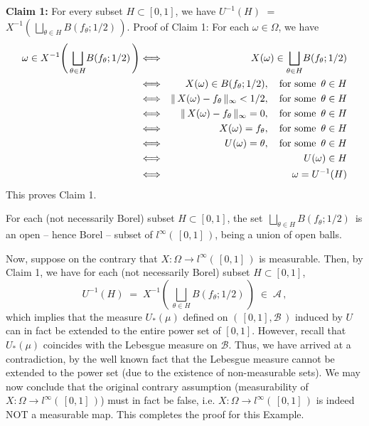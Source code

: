 \vskip 0.5cm
\noindent
\textbf{Claim 1:}\;\;
For every subset $H \subset [0,1]$, we have
$U^{-1}(H)$ $=$ $X^{-1}\!\left(\,\underset{\theta\in H}{\bigsqcup}B(f_{\theta};1/2)\,\right)$.
\vskip 0.3cm
\noindent
Proof of Claim 1:\quad
For each $\omega \in \Omega$, we have
\begin{eqnarray*}
\omega \in X^{-1}\!\left(\,\underset{\theta\in H}{\bigsqcup}B(f_{\theta};1/2)\,\right)
&\Longleftrightarrow&
	X(\omega) \in \underset{\theta\in H}{\bigsqcup}B(f_{\theta};1/2)
\\
&\Longleftrightarrow&
	X(\omega) \in B(f_{\theta};1/2),
	\quad
	\textnormal{for some \,$\theta \in H$}
\\
&\Longleftrightarrow&
	\Vert\, X(\omega) - f_{\theta}\,\Vert_{\infty} < 1/2,
	\quad
	\textnormal{for some \,$\theta \in H$}
\\
&\Longleftrightarrow&
	\Vert\, X(\omega) - f_{\theta}\,\Vert_{\infty} = 0,
	\quad
	\textnormal{for some \,$\theta \in H$}
\\
&\Longleftrightarrow&
	X(\omega) = f_{\theta},
	\quad
	\textnormal{for some \,$\theta \in H$}
\\
&\Longleftrightarrow&
	U(\omega) = \theta,
	\quad
	\textnormal{for some \,$\theta \in H$}
\\
&\Longleftrightarrow&
	U(\omega) \in H
\\
&\Longleftrightarrow&
	\omega = U^{-1}(H)
\end{eqnarray*}
This proves Claim 1.

\vskip 0.5cm
\noindent
For each (not necessarily Borel) subset $H \subset [0,1]$,
the set \,$\underset{\theta\in H}{\bigsqcup}B(f_{\theta};1/2)$\,
is an open -- hence Borel -- subset of $l^{\infty}(\,[0,1]\,)$,
being a union of open balls.

\vskip 0.3cm
\noindent
Now, suppose on the contrary that $X : \Omega \longrightarrow l^{\infty}(\,[0,1]\,)$ is measurable.
Then, by Claim 1, we have for each (not necessarily Borel) subset $H \subset [0,1]$,
\begin{equation*}
U^{-1}(H)
\;=\; X^{-1}\!\left(\,\underset{\theta\in H}{\bigsqcup}B(f_{\theta};1/2)\,\right)
\;\in\; \mathcal{A}\,,
\end{equation*}
which implies that the measure $U_{*}(\mu)$ defined on $(\,[0,1],\mathcal{B}\,)$
induced by $U$ can in fact be extended to the entire power set of $[0,1]$.
However, recall that $U_{*}(\mu)$ coincides with the Lebesgue measure on $\mathcal{B}$.
Thus, we have arrived at a contradiction, by the well known fact that the Lebesgue measure
cannot be extended to the power set (due to the existence of non-measurable sets).
We may now conclude that the original contrary assumption
(measurability of $X : \Omega \longrightarrow l^{\infty}(\,[0,1]\,)$)
must in fact be false, i.e. $X : \Omega \longrightarrow l^{\infty}(\,[0,1]\,)$
is indeed NOT a measurable map. This completes the proof for this Example.

